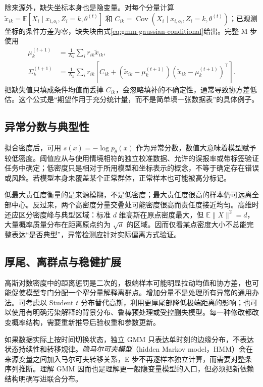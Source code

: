 \documentclass[UTF8,12pt,a4paper,fontset=fandol]{ctexart}
\begin{document}
除来源外，缺失坐标本身也是隐变量。对每个分量计算 $\widetilde x_{ik}=\mathbb E[X_i\mid x_{i,o_i},Z_i=k,\theta^{(t)}]$ 和 $C_{ik}=\operatorname{Cov}(X_i\mid x_{i,o_i},Z_i=k,\theta^{(t)})$；已观测坐标的条件方差为零，缺失块由式\eqref{eq:gmm-gaussian-conditional}给出。完整 M 步使用
\begin{align}
\mu_k^{(t+1)}&=\frac1{N_k}\sum_i r_{ik}\widetilde x_{ik},\nonumber\\
\Sigma_k^{(t+1)}&=\frac1{N_k}\sum_i r_{ik}
\left[C_{ik}+(\widetilde x_{ik}-\mu_k^{(t+1)})(\widetilde x_{ik}-\mu_k^{(t+1)})^\top\right].
\label{eq:gmm-missing-update}
\end{align}
把缺失值只填成条件均值而丢掉 $C_{ik}$，会忽略填补的不确定性，通常导致协方差低估。这个公式是“期望作用于充分统计量，而不是简单填一张数据表”的具体例子。

\subsection{异常分数与典型性}
拟合密度后，可用 $s(x)=-\log p_{\widehat\theta}(x)$ 作为异常分数，数值大意味着模型赋予较低密度。阈值应从与使用情境相符的独立校准数据、允许的误报率或带标签验证任务中确定；低密度只是相对于所用模型和坐标表示的概念，不等于确定存在错误或风险。若模型本身未覆盖某个正常群体，正常样本也可能被高分标记。

低最大责任度衡量的是来源模糊，不是低密度；最大责任度很高的样本仍可远离全部中心。反过来，两个高密度分量交叠处可能密度很高而责任度接近均匀。高维时还应区分密度峰与典型区域：标准 $d$ 维高斯在原点密度最大，但 $\mathbb E\|X\|^2=d$，大量概率质量分布在距离原点约为 $\sqrt d$ 的区域。因而仅看某点密度大小不总能完整表达“是否典型”，异常检测应针对实际偏离方式验证。

\subsection{厚尾、离群点与稳健扩展}
高斯对数密度中的距离惩罚是二次的，极端样本可能明显拉动均值和协方差，也可能促使模型专门分配一个窄分量解释离群点。增加分量不是处理所有异常的通用办法。可考虑以 Student $t$ 分布替代高斯，利用更厚尾部降低极端距离的影响；也可以使用有明确污染解释的背景分布、鲁棒预处理或受控删失模型。每一种修改都改变概率结构，需要重新推导后验权重和参数更新。

如果数据实际上按时间切换状态，独立 GMM 只表达单时刻的边缘分布，不表达状态持续性和转移规律。\emph{隐马尔可夫模型}（hidden Markov model，HMM）会在来源变量之间加入马尔可夫转移关系，E 步不再逐样本独立计算，而需要对整条序列推断。理解 GMM 因而也是理解更一般隐变量模型的入口，但必须把新依赖结构明确写进联合分布。
\end{document}
